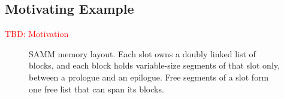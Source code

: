 \subsection{Motivating Example}
\label{sec:motivation-experiment}

\textcolor{red}{TBD: Motivation}

\newsavebox{\sammArchBox}\sbox{\sammArchBox}{}
\newsavebox{\sammLayoutBox}\sbox{\sammLayoutBox}{\resizebox{0.8\columnwidth}{!}{}}
\newlength{\sammFigH}\setlength{\sammFigH}{\dimexpr\ht\sammLayoutBox+\dp\sammLayoutBox\relax}

\begin{figure}[t]
  \centering
  \begin{minipage}[t]{0.49\textwidth}
    \centering
    \parbox[c][\sammFigH][c]{\linewidth}{\centering\usebox{\sammArchBox}}
    \caption{SAMM four-layer architecture. Jemalloc provides coarse-grained blocks. SAMM enforces slot ownership and manages intra-block segments.}
    \label{fig:samm-arch}
  \end{minipage}\hfill
  \begin{minipage}[t]{0.49\textwidth}
    \centering
    \parbox[c][\sammFigH][c]{\linewidth}{\centering\usebox{\sammLayoutBox}}
    \caption{SAMM memory layout. Each slot owns a doubly linked list of blocks, and each block holds variable-size segments of that slot only, between a prologue and an epilogue. Free segments of a slot form one free list that can span its blocks.}
    \label{fig:samm}
  \end{minipage}
\end{figure}
